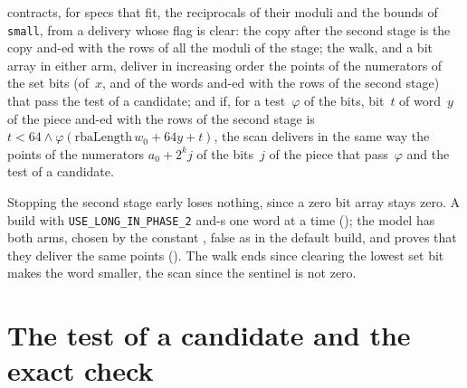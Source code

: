 \begin{definition}
  contracts, for specs that fit, the reciprocals of their moduli and the bounds of \verb|small|,
  from a delivery whose flag is clear: the copy after the second stage is the copy and-ed with the
  rows of all the moduli of the stage; the walk, and a bit array in either arm, deliver in
  increasing order the points of the numerators of the set bits (of~$x$, and of the words and-ed
  with the rows of the second stage) that pass the test of a candidate; and if, for a
  test~$\varphi$ of the bits, bit~$t$ of word~$y$ of the piece and-ed with the rows of the second
  stage is $t < 64 \wedge \varphi(\mathrm{rbaLength}\, w_0 + 64 y + t)$, the scan delivers in the
  same way the points of the numerators $a_0 + 2^k j$ of the bits~$j$ of the piece that
  pass~$\varphi$ and the test of a candidate.
\end{definition}

Stopping the second stage early loses nothing, since a zero bit array stays zero. A build with
\verb|USE_LONG_IN_PHASE_2| and-s one word at a time (); the
model has both arms, chosen by the constant , false as in the
default build, and proves that they deliver the same points
(). The walk ends since clearing the lowest set bit makes
the word smaller, the scan since the sentinel is not zero.

\section{The test of a candidate and the exact check}\label{sec:candidate}

